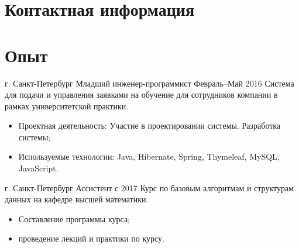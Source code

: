 \documentclass{cv}
\begin{document}

\section{Контактная информация}





\section{Опыт}

\begin{cvblock}{%
             {г. Санкт-Петербург}%
             {Младший инженер-программист}%
             {Февраль--Май 2016}}
  Система для подачи и управления заявками на обучение для сотрудников 
  компании в рамках университетской практики.
  \begin{itemize}
      \item Проектная деятельность: Участие в проектировании системы.
            Разработка системы;
      \item Используемые технологии: Java, Hibernate, Spring, Thymeleaf, MySQL,
            JavaScript.
  \end{itemize}
\end{cvblock}

\vspace{2em}

\begin{cvblock}{%
             {г. Санкт-Петербург}%
             {Ассистент}%
             {с 2017}}
  Курс по базовым алгоритмам и структурам данных на кафедре высшей математики.
  \begin{itemize}
      \item Составление программы курса;
      \item проведение лекций и практики по курсу.
  \end{itemize}
\end{cvblock}

\vspace{2em}
\end{document}
